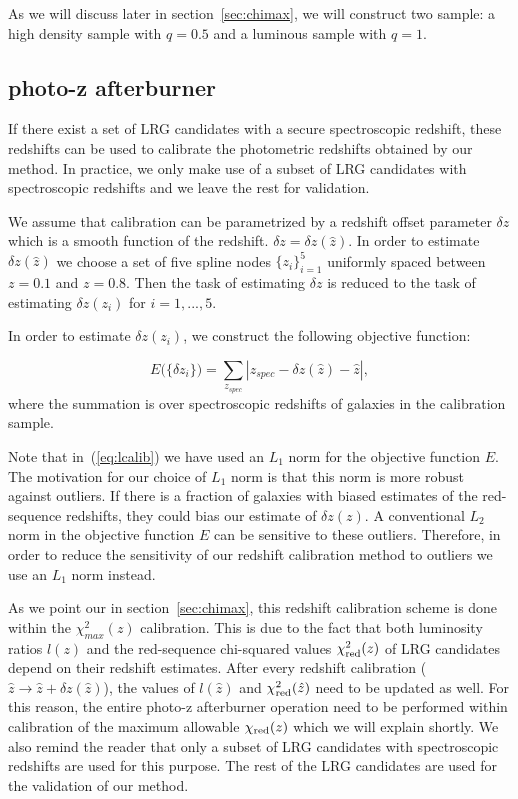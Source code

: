 \documentclass[fleqn,usenatbib]{mnras}
\newcommand{\be}{\begin{equation}}
\newcommand{\ee}{\end{equation}}
\begin{document}
As we will discuss later in section~\ref{sec:chimax}, we will construct two sample: a high density sample with $q=0.5$ and a luminous sample with $q=1$. 

\subsection{photo-z afterburner}\label{sec:afterburner}

If there exist a set of LRG candidates with a secure spectroscopic redshift, these redshifts can be used to calibrate the photometric redshifts obtained by our method. In practice, we only make use of a subset of LRG candidates with spectroscopic redshifts and we leave the rest for validation. 

We assume that calibration can be parametrized by a redshift offset parameter $\delta z$ which is a smooth function of the redshift. $\delta z = \delta z(\hat{z})$. In order to estimate $\delta z(\hat{z})$
we choose a set of five spline nodes $\{z_i\}_{i=1}^{5}$ uniformly spaced between $z=0.1$ and $z=0.8$. Then the task of estimating $\delta z$ is reduced to the task of estimating $\delta z (z_i)$ for $i=1,...,5$.

In order to estimate $\delta z(z_i)$, we construct the following objective function:

\be 
E\big(\{\delta z_i\}\big) = \sum_{z_{spec}} |z_{spec} - \delta z(\hat{z}) - \hat{z}|,
\label{eq:lcalib}
\ee 
where the summation is over spectroscopic redshifts of galaxies in the calibration sample. 

Note that in~(\ref{eq:lcalib}) we have used an $L_1$ norm for the objective function $E$. The motivation for our choice of $L_1$ norm is that this norm is more robust against outliers. If there is a fraction of galaxies with biased estimates of the red-sequence redshifts, they could bias our estimate of $\delta z(z)$. A conventional $L_2$ norm in the objective function $E$ can be sensitive to these outliers. Therefore, in order to reduce the sensitivity of our redshift calibration method to outliers we use an $L_1$ norm instead. 

As we point our in section~\ref{sec:chimax}, this redshift calibration scheme is done within the $\chi_{max}^{2}(z)$ calibration. This is due to the fact that both luminosity ratios $l(z)$ and the red-sequence chi-squared values $\chi^{2}_{\rm red}(z)$ of LRG candidates depend on their redshift estimates. 
After every redshift calibration ($\hat{z} \rightarrow \hat{z} + \delta z(\hat{z})$), the values of $l(\hat{z})$ and $\chi^{2}_{\rm red}(\hat{z})$ need to be updated as well. For this reason, the entire photo-z afterburner operation need to be performed within calibration of the maximum allowable $\chi_{\rm red}(z)$ which we will explain shortly. We also remind the reader that only a subset of LRG candidates with spectroscopic redshifts are used for this purpose. The rest of the LRG candidates are used for the validation of our method. 
\end{document}
